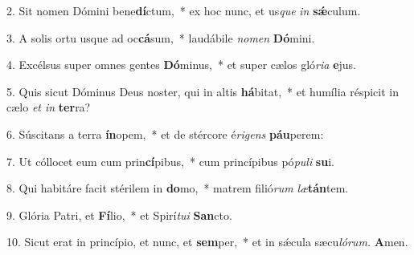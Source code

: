 \item 2. Sit nomen Dómini bene\textbf{dí}ctum,~* ex hoc nunc, et us\hspace{0.03em}\textit{que} \textit{in} \textbf{sǽ}culum.
\item 3. A solis ortu usque ad oc\textbf{cá}sum,~* laudábile \textit{nomen} \textbf{Dó}mini.
\item 4. Excélsus super omnes gentes \textbf{Dó}minus,~* et super cælos gló\textit{ria} \textbf{e}jus.
\item 5. Quis sicut Dóminus Deus noster, qui in altis \textbf{há}bitat,~* et humília réspicit in cælo \textit{et in} \textbf{ter}ra?
\item 6. Súscitans a terra \textbf{ín}opem,~* et de stércore é\hspace{0.03em}\textit{rigens} \textbf{páu}perem:
\item 7. Ut cóllocet eum cum prin\textbf{cí}pibus,~* cum princípibus pó\textit{puli} \textbf{su}i.
\item 8. Qui habitáre facit stérilem in \textbf{do}mo,~* matrem filió\textit{rum} \textit{læ}\textbf{tán}tem.
\item 9. Glória Patri, et \textbf{Fí}lio,~* et Spirí\hspace{0.03em}\textit{tui} \textbf{San}cto.
\item 10. Sicut erat in princípio, et nunc, et \textbf{sem}per,~* et in sǽcula sæcu\hspace{0.03em}\textit{lórum.} \textbf{A}men.
